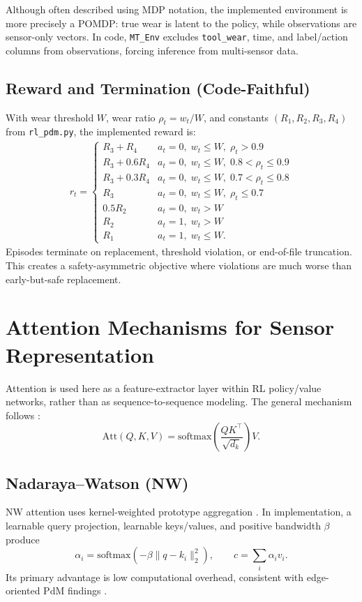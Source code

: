 \documentclass[11pt]{article}
\begin{document}
Although often described using MDP notation, the implemented environment is more precisely a POMDP: true wear is latent to the policy, while observations are sensor-only vectors. In code, \texttt{MT\_Env} excludes \texttt{tool\_wear}, time, and label/action columns from observations, forcing inference from multi-sensor data.

\subsection{Reward and Termination (Code-Faithful)}
With wear threshold $W$, wear ratio $\rho_t=w_t/W$, and constants $(R_1,R_2,R_3,R_4)$ from \texttt{rl\_pdm.py}, the implemented reward is:
\begin{align}
r_t=
\begin{cases}
R_3 + R_4 & a_t=0,\; w_t\le W,\; \rho_t>0.9 \\
R_3 + 0.6R_4 & a_t=0,\; w_t\le W,\; 0.8<\rho_t\le0.9 \\
R_3 + 0.3R_4 & a_t=0,\; w_t\le W,\; 0.7<\rho_t\le0.8 \\
R_3 & a_t=0,\; w_t\le W,\; \rho_t\le0.7 \\
0.5R_2 & a_t=0,\; w_t>W \\
R_2 & a_t=1,\; w_t>W \\
R_1 & a_t=1,\; w_t\le W.
\end{cases}
\end{align}
Episodes terminate on replacement, threshold violation, or end-of-file truncation. This creates a safety-asymmetric objective where violations are much worse than early-but-safe replacement.

\section{Attention Mechanisms for Sensor Representation}
Attention is used here as a feature-extractor layer within RL policy/value networks, rather than as sequence-to-sequence modeling. The general mechanism follows \citet{Vaswani2017Attention}:
\begin{equation}
\mathrm{Att}(Q,K,V)=\mathrm{softmax}\!\left(\frac{QK^\top}{\sqrt{d_k}}\right)V.
\end{equation}

\subsection{Nadaraya--Watson (NW)}
NW attention uses kernel-weighted prototype aggregation \citep{Nadaraya1964,Watson1964}. In implementation, a learnable query projection, learnable keys/values, and positive bandwidth $\beta$ produce
\begin{equation}
\alpha_i=\mathrm{softmax}\left(-\beta\lVert q-k_i\rVert_2^2\right),\qquad
c=\sum_i \alpha_i v_i.
\end{equation}
Its primary advantage is low computational overhead, consistent with edge-oriented PdM findings \citep{Siraskar2024NWAttention}.
\end{document}
